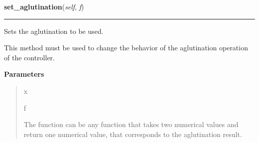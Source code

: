    \vspace{0.5ex}

    \begin{boxedminipage}{\textwidth}

    \raggedright \textbf{set\_aglutination}(\textit{self}, \textit{f})

    \vspace{-1.5ex}

    \rule{\textwidth}{0.5\fboxrule}

Sets the aglutination to be used.

This method must be used to change the behavior of the aglutination
operation of the controller.
    \vspace{1ex}

      \textbf{Parameters}
      \begin{quote}
        \begin{Ventry}{x}

          \item[f]


The function can be any function that takes two numerical values and
return one numerical value, that corresponds to the aglutination
result.
        \end{Ventry}

      \end{quote}

    \vspace{1ex}

    \end{boxedminipage}

    \label{peach:fuzzy:control:Controller:set_conorm}

    \vspace{0.5ex}

